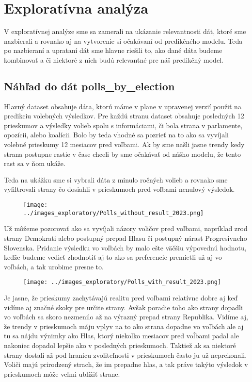 \documentclass[main.tex]{subfiles}
\begin{document}
\section{Exploratívna analýza}
V exploratívnej analýze sme sa zamerali na ukázanie relevantnosti dát, ktoré sme nazbierali a rovnako aj na vytvorenie si očakávaní od predikčného modelu. Teda po nazbieraní a uprataní dát sme hlavne riešili to, ako dané dáta budeme kombinovať a či niektoré z nich budú relevantné pre náš predikčný model.

\subsection{Náhľad do dát polls_by_election}
Hlavný dataset obsahuje dáta, ktorú máme v plane v upravenej verzií použiť na predikciu volebných výsledkov. Pre každú stranu dataset obsahuje posledných 12 prieskumov a výsledky volieb spolu s informáciami, či bola strana v parlamente, opozícii, alebo koalícii. Bolo by teda vhodné sa pozrieť na to ako sa vyvíjali volebné prieskumy 12 mesiacov pred voľbami. Ak by sme našli jasne trendy kedy strana postupne rastie v čase chceli by sme očakávať od nášho modelu, že tento rast sa v ňom ukáže. 

Teda na ukážku sme si vybrali dáta z minulo ročných volieb a rovnako sme vyfiltrovali strany čo dosiahli v prieskumoch pred voľbami nenulový výsledok. 
\begin{figure}[!htbp]
    \centering
    \texttt{[image: ../images\_exploratory/Polls\_without\_result\_2023.png]}
    \caption{}
    \label{fig:example}
\end{figure}

Už môžeme pozorovať ako sa vyvíjali názory voličov pred voľbami, napríklad zrod strany Demokrati alebo postupný prepad Hlasu či postupný nárast Progresivneho Slovenska.
Pridanie výsledku vo voľbách by malo ešte väčšiu výpovednú hodnotu, keďže budeme vedieť zhodnotiť aj to ako sa preferencie premietli už aj vo voľbách, a tak urobime presne to.
\begin{figure}[!htbp]
    \centering
    \texttt{[image: ../images\_exploratory/Polls\_with\_result\_2023.png]}
    \caption{}
    \label{fig:example}
\end{figure}

Je jasne, že prieskumy zachytávajú realitu pred voľbami relatívne dobre aj keď vidíme aj značné skoky pre určite strany. Avšak poradie toho ako strany dopadli vo voľbách sa skoro nezmenilo až na výrazný prepad strany Republika.
Vidíme aj, že trendy v prieskumoch máju vplyv na to ako strana dopadne vo voľbách ale aj tu sa nájdu výnimky ako Hlas, ktorý niekoľko mesiacov pred voĺbami padal ale nakoniec dopadol lepšie ako v posledných prieskumoch. Taktiež ak sa niektoré strany dostali až pod hranicu zvoliteľnosti v prieskumoch často ju už neprekonali. Voliči majú prirodzený strach, že im prepadne hlas, a tak práve takýto výsledok v prieskumoch môže veľmi ublížiť strane.
\end{document}
